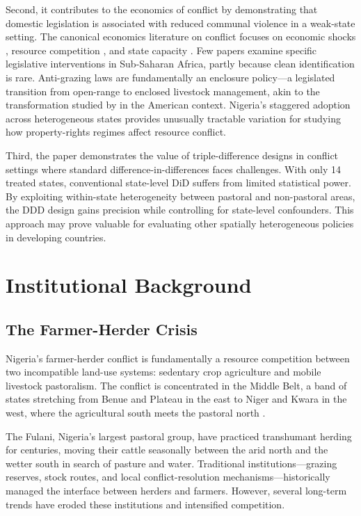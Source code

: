 \documentclass[12pt]{article}
\begin{document}
Second, it contributes to the economics of conflict by demonstrating that domestic legislation is associated with reduced communal violence in a weak-state setting. The canonical economics literature on conflict focuses on economic shocks \citep{miguel2004economic, dube2013commodity, bazzi2014economic}, resource competition \citep{hsiang2013quantifying, burke2015climate}, and state capacity \citep{besley2011pillars, dell2018nation}. Few papers examine specific legislative interventions in Sub-Saharan Africa, partly because clean identification is rare. Anti-grazing laws are fundamentally an enclosure policy---a legislated transition from open-range to enclosed livestock management, akin to the transformation studied by \citet{hornbeck2010barbed} in the American context. Nigeria's staggered adoption across heterogeneous states provides unusually tractable variation for studying how property-rights regimes affect resource conflict.

Third, the paper demonstrates the value of triple-difference designs in conflict settings where standard difference-in-differences faces challenges. With only 14 treated states, conventional state-level DiD suffers from limited statistical power. By exploiting within-state heterogeneity between pastoral and non-pastoral areas, the DDD design gains precision while controlling for state-level confounders. This approach may prove valuable for evaluating other spatially heterogeneous policies in developing countries.

\section{Institutional Background}

\subsection{The Farmer-Herder Crisis}

Nigeria's farmer-herder conflict is fundamentally a resource competition between two incompatible land-use systems: sedentary crop agriculture and mobile livestock pastoralism. The conflict is concentrated in the Middle Belt, a band of states stretching from Benue and Plateau in the east to Niger and Kwara in the west, where the agricultural south meets the pastoral north \citep{higazi2016farmer, akov2017trend}.

The Fulani, Nigeria's largest pastoral group, have practiced transhumant herding for centuries, moving their cattle seasonally between the arid north and the wetter south in search of pasture and water. Traditional institutions---grazing reserves, stock routes, and local conflict-resolution mechanisms---historically managed the interface between herders and farmers. However, several long-term trends have eroded these institutions and intensified competition.
\end{document}
